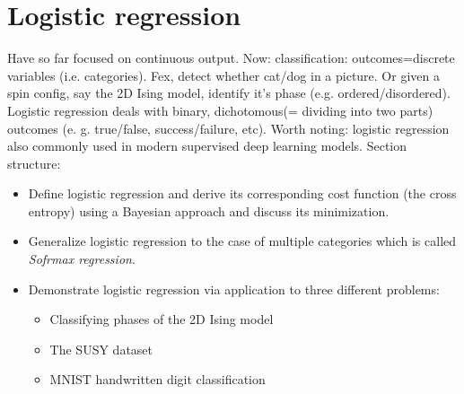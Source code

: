 \documentclass[norsk,a4paper,11pt]{article}
\begin{document}
\section{Logistic regression}
Have so far focused on continuous output. Now: classification: outcomes=discrete variables (i.e. categories). Fex, detect whether cat/dog in a picture. Or given a spin config, say the 2D Ising model, identify it's phase (e.g. ordered/disordered). Logistic regression deals with binary, dichotomous(= dividing into two parts) outcomes (e. g. true/false, success/failure, etc). Worth noting: logistic regression also commonly used in modern supervised deep learning models.
Section structure:
\begin{itemize}
	\item Define logistic regression and derive its corresponding cost function (the cross entropy) using a Bayesian approach and discuss its minimization.
	\item Generalize logistic regression to the case of multiple categories which is called \textit{Sofrmax regression}. 
	\item Demonstrate logistic regression via application to three different problems:
	\begin{itemize}
		\item Classifying phases of the 2D Ising model
		\item The SUSY dataset
		\item MNIST handwritten digit classification
	\end{itemize}
\end{itemize}
\end{document}
